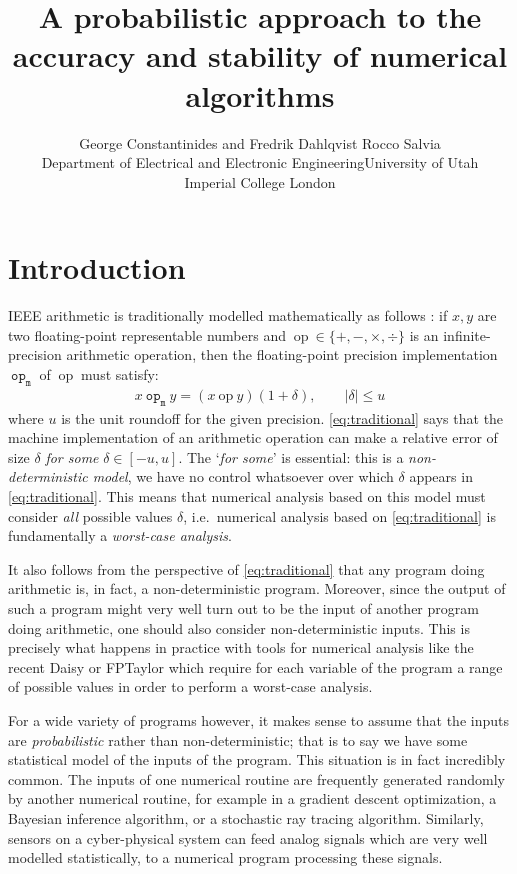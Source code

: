 \documentclass[10pt,conference]{IEEEtran}
\title{A probabilistic approach to the accuracy and stability of numerical algorithms}
\author{George Constantinides and Fredrik Dahlqvist \hspace{10em}Rocco Salvia \\ Department of Electrical and Electronic Engineering\hspace{7em}University of Utah\\ Imperial College London\hspace{13em} }
\newcommand{\ie}{i.e.\ }
\newcommand{\mop}{~\mathtt{op_m}~}
\newcommand{\iop}{~\mathrm{op}~}
\newcommand{\absv}[1]{\vert #1\vert}
\begin{document}
\maketitle

\begin{abstract}

\end{abstract}

\section{Introduction}

IEEE arithmetic \cite{ieee754} is traditionally modelled mathematically as follows \cite{higham2002accuracy}: if $x,y$ are two floating-point representable numbers and $\iop\in\{+,-,\times,\div\}$ is an infinite-precision arithmetic operation, then the floating-point precision implementation $\mop$ of $\iop$ must satisfy:
\begin{align}
x\mop y=(x\iop y)(1+\delta), \qquad\absv{\delta}\leq u\label{eq:traditional}
\end{align}
where $u$ is the unit roundoff for the given precision. \cref{eq:traditional} says that the machine implementation of an arithmetic operation can make a relative error of size $\delta$ \emph{for some} $\delta\in\left[-u,u\right]$. The `\emph{for some}' is essential: this is a \emph{non-deterministic model}, we have no control whatsoever over which $\delta$ appears in \cref{eq:traditional}. This means that numerical analysis based on this model must consider \emph{all} possible values $\delta$, \ie numerical analysis based on \cref{eq:traditional} is fundamentally a \emph{worst-case analysis}. 

It also follows from the perspective of \cref{eq:traditional} that any program doing arithmetic is, in fact, a non-deterministic program. Moreover, since the output of such a program might very well turn out to be the input of another program doing arithmetic, one should also consider non-deterministic inputs. This is precisely what happens in practice with tools for numerical analysis like the recent Daisy \cite{darulova2018daisy} or FPTaylor \cite{solovyev2018rigorous} which require for each variable of the program a range of possible values in order to perform a worst-case analysis.

For a wide variety of programs however, it makes sense to assume that the inputs are \emph{probabilistic} rather than non-deterministic; that is to say we have some statistical model of the inputs of the program. This situation is in fact incredibly common. The inputs of one numerical routine are frequently generated randomly by another numerical routine, for example in a gradient descent optimization, a Bayesian inference algorithm, or a stochastic ray tracing algorithm. Similarly, sensors on a cyber-physical system can feed analog signals which are very well modelled statistically, to a numerical program processing these signals. 
\end{document}
